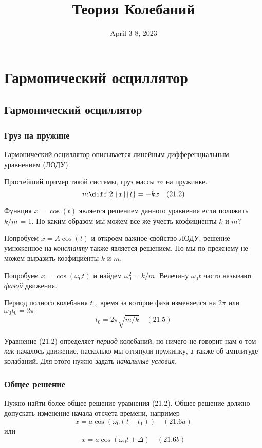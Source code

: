 \documentclass[12pt]{article}
\date{April 3-8, 2023}
\title{Теория Колебаний}
\begin{document}
\maketitle

\tableofcontents

\newpage

\section{Гармонический осциллятор}

\subsection{Гармонический осциллятор}

\subsubsection{Груз на пружине}

Гармонический осциллятор описывается линейным дифференциальным уравнением (ЛОДУ).

Простейший пример такой системы, груз массы $m$ на пружинке.
\[
m\diff[2]{x}{t}=-kx \quad (21.2)
\]

Функция $x=\cos(t)$ является решением данного уравнения если положить $k/m$ = 1.
Но каким образом мы можем все же учесть коэфициенты $k$ и $m$?

Попробуем $x=A\cos(t)$ и откроем важное свойство ЛОДУ: решение умноженное на \textit{константу} также является решением. Но мы по-прежнему не можем выразить коэфициенты $k$ и $m$.

Попробуем $x=\cos(\omega_0 t)$ и найдем $\omega_0^2=k/m$. Велечину $\omega_0 t$ часто называют \textit{фазой} движения.

Период полного колебания $t_0$, время за которое фаза изменяеися на $2\pi$ или $\omega_0t_0=2\pi$
\[
    t_0=2\pi\sqrt{m/k} \quad (21.5)
\]

Уравнение (21.2) определяет \textit{период} колебаний, но ничего не говорит нам о том \textit{как} началось движение, насколько мы оттянули пружинку, а также об амплитуде колабаний. Для этого нужно задать \textit{начальные условия}.

\subsubsection{Общее решение}

Нужно найти более общее решение уравнения (21.2). Общее решение должно допускать изменение начала отсчета времени, например
\[
    x=a\cos(\omega_0(t-t_1)) \quad (21.6a)
\]
или
\[
    x=a\cos(\omega_0t+\Delta) \quad (21.6b)
\]
\end{document}
